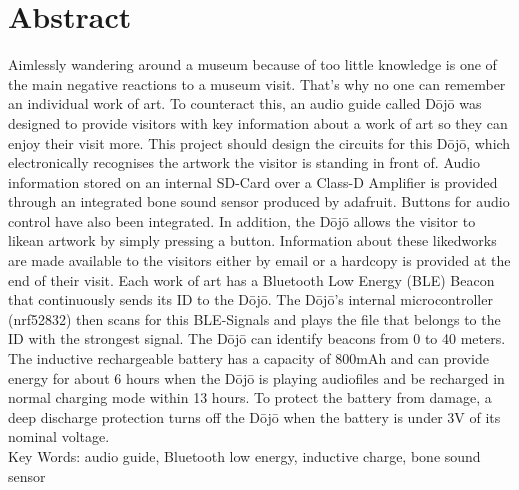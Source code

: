 \section*{Abstract}\label{sec:abstract}
Aimlessly wandering around a museum because of too little knowledge is one of the main negative reactions to a museum visit. That’s why no one can remember an individual work of art. To counteract this, an audio guide called Dōjō was designed to provide visitors with key information about a work of art so they can enjoy their visit more. This project should design the circuits for this Dōjō, which electronically recognises the artwork the visitor is standing in front of. Audio information stored on an internal SD-Card over a Class-D Amplifier is provided through an integrated bone sound sensor produced by adafruit. Buttons for audio control have also been integrated. In addition, the Dōjō allows the visitor to \glqq like\grqq an artwork by simply pressing a button. Information about these \glqq liked\grqq works are made available to the visitors either by email or a hardcopy is provided at the end of their visit. Each work of art has a Bluetooth Low Energy (BLE) Beacon that continuously sends its ID to the Dōjō. The Dōjō’s internal microcontroller (nrf52832) then scans for this BLE-Signals and plays the file that belongs to the ID with the strongest signal. The Dōjō can identify beacons from 0 to 40 meters. The inductive rechargeable battery has a capacity of 800mAh and can provide energy for about 6 hours when the Dōjō is playing audiofiles and be recharged in normal charging mode within 13 hours. To protect the battery from damage, a deep discharge protection turns off the Dōjō when the battery is under 3V of its nominal voltage.\\[0.25cm]
Key Words: audio guide, Bluetooth low energy, inductive charge, bone sound sensor